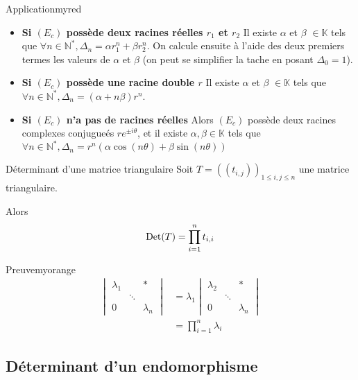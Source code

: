 \begin{omed}{Application}{myred}
\begin{itemize}
            \item \textbf{Si $(E_c)$ possède deux racines réelles $r_1$ et $r_2$} \quad Il existe $\alpha$ et $\beta$ $\in \mathbb{K}$ tels que $\forall n \in \mathbb{N}^*, \Delta_{n} = \alpha r_1^n + \beta r_2^n$. On calcule ensuite à l’aide des deux premiers termes les valeurs de $\alpha$ et $\beta$ (on peut se simplifier la tache en posant $\Delta_0 = 1$). 
            \item \textbf{Si $(E_c)$ possède une racine double $r$} \quad Il existe $\alpha$ et $\beta$ $\in \mathbb{K}$ tels que $\forall n \in \mathbb{N}^*, \Delta_n = (\alpha + n \beta) r^n$.
            \item \textbf{Si $(E_c)$ n’a pas de racines réelles} \quad Alors $(E_c)$ possède deux racines complexes conjugueés $r e^{\pm i \theta}$, et il existe $\alpha, \beta \in \mathbb{K}$ tels que $\forall n \in \mathbb{N}^*, \Delta_n = r^n \left(\alpha \cos(n\theta) + \beta \sin(n \theta)\right)$
        \end{itemize}
    \end{omed}

    \begin{coro}{Déterminant d’une matrice triangulaire}{}
        Soit $T = \left((t_{i,j})\right)_{1 \leq i,j \leq n}$ une matrice triangulaire.

        Alors \[ \operatorname{Det}(T)=\prod_{i=1}^n t_{i,i} \]
    \end{coro}

    \begin{demo}{Preuve}{myorange}
        \begin{align*}
            \begin{vmatrix}
                \lambda_1 & & * \\
                & \ddots & \\
                0 & & \lambda_n
            \end{vmatrix} &= \lambda_1 \begin{vmatrix}
                \lambda_2 & & * \\
                & \ddots & \\
                0 & & \lambda_n
            \end{vmatrix} \\
            &= \prod_{i=1}^n \lambda_i
        \end{align*}
    \end{demo}

\subsection{Déterminant d’un endomorphisme}

